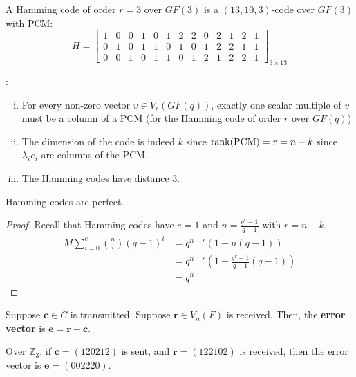 \begin{exbox}
    \begin{example}
        A Hamming code of order $ r=3 $ over $ GF(3) $ is a $ (13,10,3) $-code over $ GF(3) $ with
        PCM:
        \[ H=
            \left[\begin{array}{ccc|ccc|ccc|ccc|c}
                    1 & 0 & 0 & 1 & 0 & 1 & 2 & 2 & 0 & 2 & 1 & 2 & 1 \\
                    0 & 1 & 0 & 1 & 1 & 0 & 1 & 0 & 1 & 2 & 2 & 1 & 1 \\
                    0 & 0 & 1 & 0 & 1 & 1 & 0 & 1 & 2 & 1 & 2 & 2 & 1
                \end{array}\right]_{3\times 13} \]
    \end{example}
\end{exbox}

:
\begin{enumerate}[(i)]
    \item For every non-zero vector $ v\in V_r(GF(q)) $, exactly one scalar multiple of $ v $
          must be a column of a PCM (for the Hamming code of order $ r $ over $ GF(q) $)
    \item The dimension of the code is indeed $ k $ since $ \operatorname{rank}(\text{PCM})=r=n-k $
          since $ \lambda_i e_i $ are columns of the PCM.
    \item The Hamming codes have distance 3.
\end{enumerate}

\begin{thmbox}
    \begin{theorem}
        Hamming codes are perfect.
    \end{theorem}
\end{thmbox}
\begin{proof}
    Recall that Hamming codes have $ e=1 $ and $ n=\frac{q^r-1}{q-1} $ with $ r=n-k $.
    \begin{align*}
        M \sum\limits_{i=0}^{e} \binom{n}{i}(q-1)^i
         & =q^{n-r}(1+n(q-1))                               \\
         & =q^{n-r}\left( 1+\frac{q^r-1}{q-1} (q-1) \right) \\
         & =q^n
    \end{align*}
\end{proof}

\begin{defbox}
    \begin{definition}
        Suppose $ \bm{c}\in C $ is transmitted. Suppose $ \bm{r}\in V_n(F) $ is received.
        Then, the \textbf{error vector} is $ \bm{e}=\bm{r}-\bm{c} $.
    \end{definition}
\end{defbox}

\begin{exbox}
    \begin{example}
        Over $ \mathbb{Z}_3 $, if $ \bm{c}=(120212) $ is sent, and $ \bm{r}=(122102) $ is received, then
        the error vector is $ \bm{e}=(002220) $.
    \end{example}
\end{exbox}